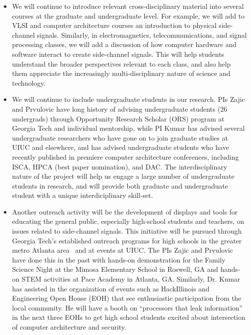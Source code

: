 \documentclass[11 pt]{article}
\begin{document}
\begin{itemize}[topsep=0pt,itemsep=0pt]

\item We will continue to introduce relevant cross-disciplinary material into several courses at the graduate and undergraduate level.
For example, we will add to VLSI and computer architecture courses an introduction to physical side-channel signals.
Similarly, in electromagnetics, telecommunications, and signal processing classes, we will add a discussion of how computer
hardware and software interact to create side-channel signals. This will help students understand the broader perspectives relevant to
each class, and also help them appreciate the increasingly multi-disciplinary nature of science and technology.

\item We will continue to include undergraduate students in our research.
PIs Zajic and Prvulovic have long history of advising undergraduate students (26 undergrads)
through Opportunity Research Scholar (ORS) program at Georgia Tech and individual mentorship,
while PI Kumar has advised several undergraduate researchers who have gone on to join graduate
studies at UIUC and elsewhere, and has advised undergraduate students who have recently published
in premiere computer architecture conferences, including ISCA, HPCA (best paper nomination),
and DAC. The interdisciplinary nature of the project will help us engage a large number of undergraduate
students in research, and will provide both graduate and undergraduate student with a unique interdiciplinary skill-set.

\item Another outreach activity will be the development of displays
  and tools for educating the general public, especially high-school
  students and teachers, on issues related to side-channel signals.
  This initiative will be pursued through Georgia Tech’s established
  outreach programs for high schools in the greater metro Atlanta
  area~\cite{Conrad2022} and at events at UIUC.
  The PIs Zajic and Prvulovic have done this in the past with hands-on
  demonstration for the Family Science Night at the Mimosa Elementary
  School in Roswell, GA and hands-on STEM activities at Pace Academy
  in Atlanta, GA.
Similarly, Dr. Kumar has assisted in the organization of events such as
HackIllinois and Engineering Open House (EOH) that see enthusiastic
participation from the local community.
He will have a booth on “processors that leak information” in the next three EOHs to get high school students excited about intersection of computer architecture and security.
\end{itemize}
\end{document}
